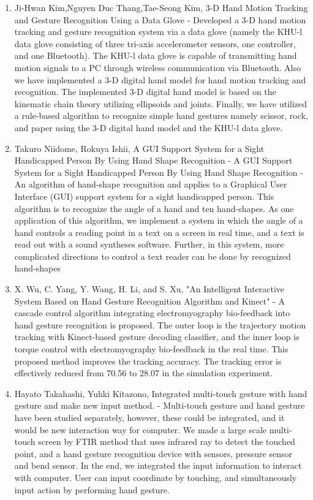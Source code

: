 \documentclass[11pt]{report}
\begin{document}
\begin{enumerate}
    \item Ji-Hwan Kim,Nguyen Duc Thang,Tae-Seong Kim, 3-D Hand Motion Tracking and Gesture Recognition Using a Data Glove \cite{4} - Developed a 3-D hand motion tracking and gesture recognition system via a data glove (namely the KHU-l data glove consisting of three tri-axis accelerometer sensors, one controller, and one Bluetooth). The KHU-l data glove is capable of transmitting hand motion signals to a PC through wireless communication via Bluetooth. Also we have implemented a 3-D digital hand model for hand motion tracking and recognition. The implemented 3-D digital hand model is based on the kinematic chain theory utilizing ellipsoids and joints. Finally, we have utilized a rule-based algorithm to recognize simple hand gestures namely scissor, rock, and paper using the 3-D digital hand model and the KHU-l data glove.
    
    \item Takuro Niidome, Rokuya Ishii, A GUI Support System for a Sight Handicapped Person By Using Hand Shape Recognition \cite{5} - A GUI Support System for a Sight Handicapped Person By Using Hand Shape Recognition - An algorithm of hand-shape recognition and applies to a Graphical User Interface (GUI) support system for a sight handicapped person. This algorithm is to recognize the angle of a hand and ten hand-shapes. As one application of this algorithm, we implement a system in which the angle of a hand controls a reading point in a text on a screen in real time, and a text is read out with a sound syntheses software. Further, in this system, more complicated directions to control a text reader can be done by recognized hand-shapes
    
    \item X. Wu, C. Yang, Y. Wang, H. Li, and S. Xu, "An Intelligent Interactive System Based on Hand Gesture Recognition Algorithm and Kinect" \cite{6} - A cascade control algorithm integrating electromyography bio-feedback into hand gesture recognition is proposed. The outer loop is the trajectory motion tracking with Kinect-based gesture decoding classifier, and the inner loop is torque control with electromyography bio-feedback in the real time. This proposed method improves the tracking accuracy. The tracking error is effectively reduced from 70.56 to 28.07 in the simulation experiment.
    
    \item Hayato Takahashi, Yuhki Kitazono, Integrated multi-touch gesture with hand gesture and  make new input method. \cite{7} - Multi-touch gesture and hand gesture have been studied separately, however, these could be integrated, and it would be new interaction way for computer. We made a large scale multi-touch screen by FTIR method that uses infrared ray to detect the touched point, and a hand gesture recognition device with sensors, pressure  sensor  and  bend  sensor.  In  the  end,  we  integrated  the input  information  to  interact  with  computer. User can input coordinate by touching, and simultaneously input action by performing hand gesture.
    

\end{enumerate}
\end{document}
